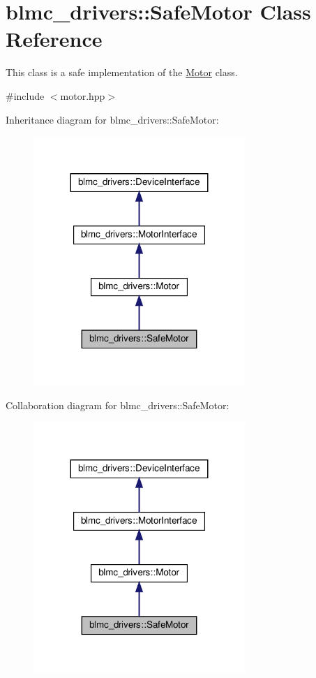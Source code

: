 \hypertarget{classblmc__drivers_1_1SafeMotor}{}\section{blmc\+\_\+drivers\+:\+:Safe\+Motor Class Reference}
\label{classblmc__drivers_1_1SafeMotor}


This class is a safe implementation of the \hyperlink{classblmc__drivers_1_1Motor}{Motor} class.  




{\ttfamily \#include $<$motor.\+hpp$>$}



Inheritance diagram for blmc\+\_\+drivers\+:\+:Safe\+Motor\+:
\nopagebreak
\begin{figure}[H]
\begin{center}
\leavevmode
\includegraphics[width=227pt]{classblmc__drivers_1_1SafeMotor__inherit__graph}
\end{center}
\end{figure}


Collaboration diagram for blmc\+\_\+drivers\+:\+:Safe\+Motor\+:
\nopagebreak
\begin{figure}[H]
\begin{center}
\leavevmode
\includegraphics[width=227pt]{classblmc__drivers_1_1SafeMotor__coll__graph}
\end{center}
\end{figure}
